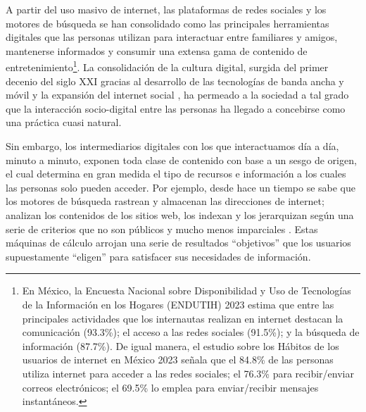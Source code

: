 \documentclass[
  spanish,
  11pt,
  a4paper,
]{scrbook}
\begin{document}

A partir del uso masivo de internet, las plataformas de redes sociales y
los motores de búsqueda se han consolidado como las principales
herramientas digitales que las personas utilizan para interactuar entre
familiares y amigos, mantenerse informados y consumir una extensa gama
de contenido de entretenimiento\footnote{En México, la Encuesta Nacional
  sobre Disponibilidad y Uso de Tecnologías de la Información en los
  Hogares (ENDUTIH) 2023 estima que entre las principales actividades
  que los internautas realizan en internet destacan la comunicación
  (93.3\%); el acceso a las redes sociales (91.5\%); y la búsqueda de
  información (87.7\%). De igual manera, el estudio sobre los Hábitos de
  los usuarios de internet en México 2023 señala que el 84.8\% de las
  personas utiliza internet para acceder a las redes sociales; el 76.3\%
  para recibir/enviar correos electrónicos; el 69.5\% lo emplea para
  enviar/recibir mensajes instantáneos.}. La consolidación de la cultura
digital, surgida del primer decenio del siglo XXI gracias al desarrollo
de las tecnologías de banda ancha y móvil y la expansión del internet
social \autocite{Raine2012}, ha permeado a la sociedad a tal grado que
la interacción socio-digital entre las personas ha llegado a concebirse
como una práctica cuasi natural.

Sin embargo, los intermediarios digitales con los que interactuamos día
a día, minuto a minuto, exponen toda clase de contenido con base a un
sesgo de origen, el cual determina en gran medida el tipo de recursos e
información a los cuales las personas solo pueden acceder. Por ejemplo,
desde hace un tiempo se sabe que los motores de búsqueda rastrean y
almacenan las direcciones de internet; analizan los contenidos de los
sitios web, los indexan y los jerarquizan según una serie de criterios
que no son públicos y mucho menos imparciales
\autocite[15]{Halavais2009}. Estas máquinas de cálculo arrojan una serie
de resultados ``objetivos'' que los usuarios supuestamente ``eligen''
para satisfacer sus necesidades de información.
\end{document}

